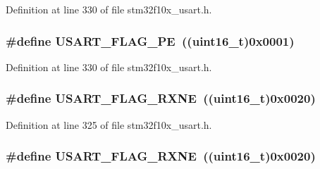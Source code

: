 Definition at line 330 of file stm32f10x\+\_\+usart.\+h.

\subsubsection[{\texorpdfstring{U\+S\+A\+R\+T\+\_\+\+F\+L\+A\+G\+\_\+\+PE}{USART_FLAG_PE}}]{\setlength{\rightskip}{0pt plus 5cm}\#define U\+S\+A\+R\+T\+\_\+\+F\+L\+A\+G\+\_\+\+PE~(({\bf uint16\+\_\+t})0x0001)}\hypertarget{group___u_s_a_r_t___flags_ga5e87fde5704f27c75df25395e23404ad}{}\label{group___u_s_a_r_t___flags_ga5e87fde5704f27c75df25395e23404ad}


Definition at line 330 of file stm32f10x\+\_\+usart.\+h.

\subsubsection[{\texorpdfstring{U\+S\+A\+R\+T\+\_\+\+F\+L\+A\+G\+\_\+\+R\+X\+NE}{USART_FLAG_RXNE}}]{\setlength{\rightskip}{0pt plus 5cm}\#define U\+S\+A\+R\+T\+\_\+\+F\+L\+A\+G\+\_\+\+R\+X\+NE~(({\bf uint16\+\_\+t})0x0020)}\hypertarget{group___u_s_a_r_t___flags_ga11d6b70c8f00216b6d8a43790dfdcf2f}{}\label{group___u_s_a_r_t___flags_ga11d6b70c8f00216b6d8a43790dfdcf2f}


Definition at line 325 of file stm32f10x\+\_\+usart.\+h.

\subsubsection[{\texorpdfstring{U\+S\+A\+R\+T\+\_\+\+F\+L\+A\+G\+\_\+\+R\+X\+NE}{USART_FLAG_RXNE}}]{\setlength{\rightskip}{0pt plus 5cm}\#define U\+S\+A\+R\+T\+\_\+\+F\+L\+A\+G\+\_\+\+R\+X\+NE~(({\bf uint16\+\_\+t})0x0020)}\hypertarget{group___u_s_a_r_t___flags_ga11d6b70c8f00216b6d8a43790dfdcf2f}{}\label{group___u_s_a_r_t___flags_ga11d6b70c8f00216b6d8a43790dfdcf2f}


